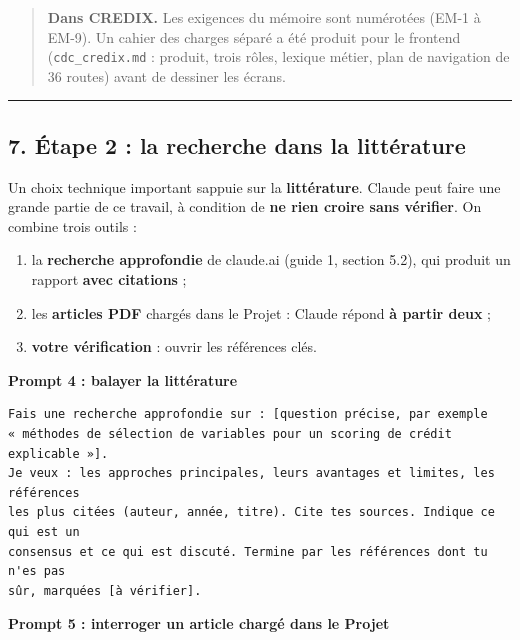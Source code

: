 \documentclass[
  french,
  11pt,
  a4paper,
]{article}
\providecommand{\tightlist}{%
  \setlength{\itemsep}{0pt}\setlength{\parskip}{0pt}}
\begin{document}
\begin{quote}
\textbf{Dans CREDIX.} Les exigences du mémoire sont numérotées (EM-1 à
EM-9). Un cahier des charges séparé a été produit pour le frontend
(\texttt{cdc\_credix.md} : produit, trois rôles, lexique métier, plan de
navigation de 36 routes) avant de dessiner les écrans.
\end{quote}

\begin{center}\rule{0.5\linewidth}{0.5pt}\end{center}

\subsection{7. Étape 2 : la recherche dans la
littérature}\label{7-uxe9tape-2--la-recherche-dans-la-littuxe9rature}

Un choix technique important s\textquotesingle appuie sur la
\textbf{littérature}. Claude peut faire une grande partie de ce travail,
à condition de \textbf{ne rien croire sans vérifier}. On combine trois
outils :

\begin{enumerate}
\def\labelenumi{\arabic{enumi}.}
\tightlist
\item
  la \textbf{recherche approfondie} de claude.ai (guide 1, section 5.2),
  qui produit un rapport \textbf{avec citations} ;
\item
  les \textbf{articles PDF} chargés dans le Projet : Claude répond
  \textbf{à partir d\textquotesingle eux} ;
\item
  \textbf{votre vérification} : ouvrir les références clés.
\end{enumerate}

\textbf{Prompt 4 : balayer la littérature}

\begin{Verbatim}[breaklines=true,breakanywhere=true,fontsize=\small,frame=leftline,framerule=1.6pt,rulecolor=\color{credixblue},framesep=3mm,xleftmargin=2mm,xrightmargin=1mm]
Fais une recherche approfondie sur : [question précise, par exemple
« méthodes de sélection de variables pour un scoring de crédit explicable »].
Je veux : les approches principales, leurs avantages et limites, les références
les plus citées (auteur, année, titre). Cite tes sources. Indique ce qui est un
consensus et ce qui est discuté. Termine par les références dont tu n'es pas
sûr, marquées [à vérifier].
\end{Verbatim}

\textbf{Prompt 5 : interroger un article chargé dans le Projet}
\end{document}
